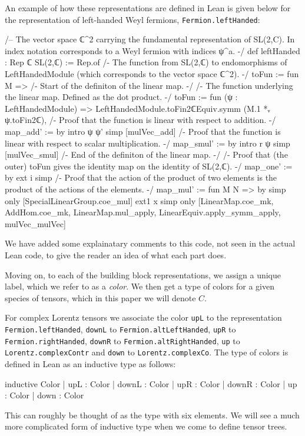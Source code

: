 \documentclass[a4paper, 11pt]{article}
\begin{document}
An example of how these representations are defined in Lean is given below for the representation 
of left-handed Weyl fermions, \lstinline|Fermion.leftHanded|:
\begin{codeLong}
/-- The vector space ℂ^2 carrying the fundamental representation of SL(2,C).
  In index notation corresponds to a Weyl fermion with indices ψ^a. -/
def leftHanded : Rep ℂ SL(2,ℂ) := Rep.of {
  /- The function from SL(2,ℂ) to endomorphisms of LeftHandedModule 
    (which corresponds to the vector space ℂ^2). -/
  toFun := fun M => {
    /- Start of the definiton of the linear map. -/
    /- The function underlying the linear map. Defined as the dot product. -/
    toFun := fun (ψ : LeftHandedModule) =>
      LeftHandedModule.toFin2ℂEquiv.symm (M.1 *ᵥ ψ.toFin2ℂ),
    /- Proof that the function is linear with respect to addition. -/
    map_add' := by
      intro ψ ψ'
      simp [mulVec_add]
    /- Proof that the function is linear with respect to scalar multiplication. -/
    map_smul' := by
      intro r ψ
      simp [mulVec_smul]
    /- End of the definiton of the linear map. -/}
  /- Proof that (the outer) toFun gives the identity map on the identity of SL(2,ℂ). -/
  map_one' := by
    ext i
    simp
  /- Proof that the action of the product of two elements is 
    the product of the actions of the elements. -/
  map_mul' := fun M N => by
    simp only [SpecialLinearGroup.coe_mul]
    ext1 x
    simp only [LinearMap.coe_mk, AddHom.coe_mk, LinearMap.mul_apply, LinearEquiv.apply_symm_apply,
      mulVec_mulVec]}
\end{codeLong} 
We have added some explainatary comments to this code, not seen in the actual Lean code, to give 
the reader an idea of what each part does. 

Moving on, to each of the building block representations, we assign a unique label, 
which we refer to as a \emph{color}. We then get a type of colors for a given species of tensors,
which in this paper we will denote $C$. 

For complex Lorentz tensors we associate the color \lstinline|upL| to the representation 
\lstinline|Fermion.leftHanded|, \lstinline|downL| to \lstinline|Fermion.altLeftHanded|,
\lstinline|upR| to \lstinline|Fermion.rightHanded|, \lstinline|downR| to \lstinline|Fermion.altRightHanded|,
\lstinline|up| to \lstinline|Lorentz.complexContr| and \lstinline|down| to \lstinline|Lorentz.complexCo|.
The type of colors is defined in Lean as an inductive type as follows:
\begin{code}
inductive Color
  | upL : Color
  | downL : Color
  | upR : Color
  | downR : Color
  | up : Color
  | down : Color
\end{code}
This can roughly be thought of as the type with six elements. We will see a much more complicated form 
of inductive type when we come to define tensor trees.
\end{document}
